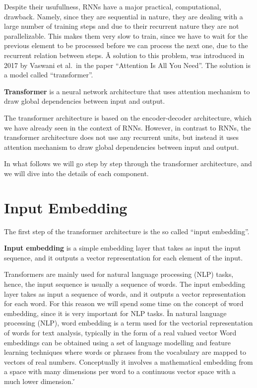 Despite their usufullness, RNNs have a major practical, computational, drawback. Namely, since they are sequential in
nature, they are dealing with a large number of training steps and due to their recurrent nature they are not
parallelizable. This makes them very slow to train, since we have to wait for the previous element to be processed
before we can process the next one, due to the recurrent relation between steps. \v

A solution to this problem, was introduced in 2017 by Vaswani et al.\ in the paper ``Attention Is All You Need''. The
solution is a model called ``transformer''.

\bd[Transformer]
\textbf{Transformer} is a neural network architecture that uses attention mechanism to draw global dependencies
between input and output.
\ed

The transformer architecture is based on the encoder-decoder architecture, which we have already seen in the context
of RNNs. However, in contrast to RNNs, the transformer architecture does not use any recurrent units, but instead it
uses attention mechanism to draw global dependencies between input and output.


In what follows we will go step by step through the transformer architecture, and we will dive into the details of
each component.

\section{Input Embedding}


The first step of the transformer architecture is the so called ``input embedding''.

\textbf{Input embedding} is a simple embedding layer that takes as input the input sequence, and it outputs a vector
representation for each element of the input.
\ed

Transformers are mainly used for natural language processing (NLP) tasks, hence, the input sequence is usually a
sequence of words. The input embedding layer takes as input a sequence of words, and it outputs a vector
representation for each word. For this reason we will spend some time on the concept of word embedding, since it is
very important for NLP tasks. \v

In natural language processing (NLP), word embedding is a term used for the vectorial representation of words for
text analysis, typically in the form of a real valued vector  Word embeddings can be obtained using a set of language
modelling and feature learning techniques where words or phrases from the vocabulary are mapped to vectors of real
numbers. Conceptually it involves a mathematical embedding from a space with many dimensions per word to a continuous
vector space with a much lower dimension. \v

